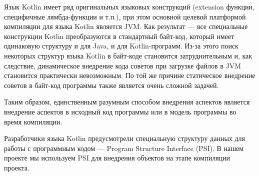 \documentclass[conference]{IEEEtran}
\begin{document}
Язык Kotlin имеет ряд оригинальных языковых конструкций (extension функции,
специфичные лямбда-функции и т.п.), при этом основной целевой платформой
компиляции для языка Kotlin является JVM.
Как результат --- все специальные конструкции Kotlin преобразуются в стандартный
байт-код, который имеет одинаковую структуру и для Java, и для Kotlin-программ.
Из-за этого поиск некоторых структур языка Kotlin в байт-коде становится
затруднительным и, как следствие, динамическое внедрение кода советов при
загрузке файлов в JVM становится практически невозможным.
По той же причине статическое внедрение советов в байт-код программы также
является очень сложной задачей.

Таким образом, единственным разумным способом внедрения аспектов является
внедрение аспектов в исходный код программы или в модель программы во время
компиляции. 

Разработчики языка Kotlin предусмотрели специальную структуру данных для работы
с программным кодом --- Program Structure Interface (PSI).
В нашем проекте мы используем PSI для внедрения объектов на этапе компиляции
проекта. 



\end{document}
